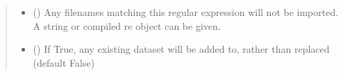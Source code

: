\documentclass[letterpaper,10pt,english]{sphinxmanual}
\begin{document}
\begin{fulllineitems}
\begin{quote}
\begin{description}
\begin{itemize}
\item {} 
 (\sphinxstyleliteralemphasis{, }) \textendash{} Any filenames matching this regular expression will not be
imported. A string or compiled re object can be given.

\item {} 
 (\sphinxstyleliteralemphasis{, }) \textendash{} If True, any existing dataset will be added to, rather
than replaced (default False)

\end{itemize}

\end{description}\end{quote}

\end{fulllineitems}

\end{document}
